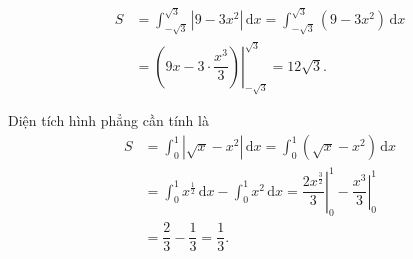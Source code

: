 \begin{bt}
{\begin{listEX}
			\begin{align*}
				S&=\displaystyle\int_{-\sqrt{3}}^{\sqrt{3}}\left| 9-3x^2 \right|\mathrm{\,d}x=\int_{-\sqrt{3}}^{\sqrt{3}}\left( 9-3x^2  \right)\mathrm{\,d}x\\
				&=\left. \left( 9x-3\cdot\dfrac{x^3}{3}  \right) \right|_{-\sqrt{3}}^{\sqrt{3}}=12\sqrt{3}.
			\end{align*}
			\item Diện  tích hình phẳng cần tính là
			\begin{align*}
				S&=\displaystyle\int_{0}^{1}\left|  \sqrt{x}-x^2 \right|\mathrm{\,d}x
				=\int_{0}^{1}\left( \sqrt{x}-x^2  \right)\mathrm{\,d}x\\
				&=\int_{0}^{1}x^{\tfrac{1}{2}}\mathrm{\,d}x-\int_{0}^{1}x^2\mathrm{\,d}x=\left. \dfrac{2x^{\tfrac{3}{2}}}{3} \right|_{0}^{1}-\left. \dfrac{x^3}{3} \right|_{0}^{1}\\ 
				 &=\dfrac{2}{3}-\dfrac{1}{3}=\dfrac{1}{3}.
			\end{align*}
		\end{listEX}
	} 
\end{bt}

